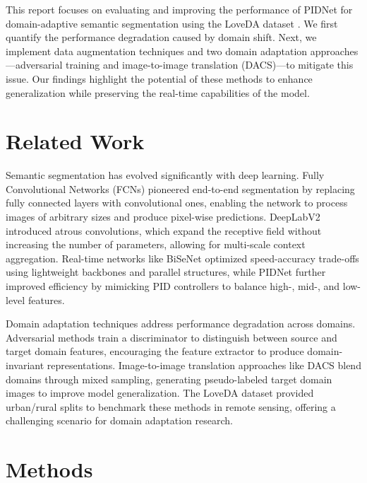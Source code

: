 \documentclass{article}
\begin{document}
\begin{multicols}{2}
		This report focuses on evaluating and improving the performance of PIDNet for domain-adaptive semantic segmentation using the LoveDA dataset \cite{loveda2021}. We first quantify the performance degradation caused by domain shift. Next, we implement data augmentation techniques and two domain adaptation approaches—adversarial training and image-to-image translation (DACS)—to mitigate this issue. Our findings highlight the potential of these methods to enhance generalization while preserving the real-time capabilities of the model.
		
		\section{Related Work}
		Semantic segmentation has evolved significantly with deep learning. Fully Convolutional Networks (FCNs) \cite{long2015fcn} pioneered end-to-end segmentation by replacing fully connected layers with convolutional ones, enabling the network to process images of arbitrary sizes and produce pixel-wise predictions. DeepLabV2 \cite{chen2018deeplab} introduced atrous convolutions, which expand the receptive field without increasing the number of parameters, allowing for multi-scale context aggregation. Real-time networks like BiSeNet \cite{yu2018bisenet} optimized speed-accuracy trade-offs using lightweight backbones and parallel structures, while PIDNet \cite{pidnet2023} further improved efficiency by mimicking PID controllers to balance high-, mid-, and low-level features.
		
		Domain adaptation techniques address performance degradation across domains. Adversarial methods \cite{tsai2018learning} train a discriminator to distinguish between source and target domain features, encouraging the feature extractor to produce domain-invariant representations. Image-to-image translation approaches like DACS \cite{tranheden2021dacs} blend domains through mixed sampling, generating pseudo-labeled target domain images to improve model generalization. The LoveDA dataset \cite{loveda2021} provided urban/rural splits to benchmark these methods in remote sensing, offering a challenging scenario for domain adaptation research.
		
		\section{Methods}

\end{multicols}
\end{document}
